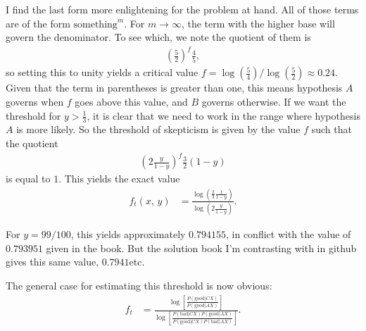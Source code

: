 \documentclass{article}
\begin{document}
I find the last form more enlightening for the problem at hand. All of those terms are of the form $\text{something}^m$. For $m\rightarrow\infty$, the term with the higher base will govern the denominator. To see which, we note the quotient of them is
\begin{align*}
	\left(\frac52\right)^f\frac45,
\end{align*}
so setting this to unity yields a critical value $f=\log\left(\frac54\right)/\log\left(\frac52\right)\approx0.24$. Given that the term in parentheses is greater than one, this means hypothesis $A$ governs when $f$ goes above this value, and $B$ governs otherwise. If we want the threshold for $y>\frac13$, it is clear that we need to work in the range where hypothesis $A$ is more likely. So the threshold of skepticism is given by the value $f$ such that the quotient
\begin{align*}
	\left(2\frac{y}{1-y}\right)^f\frac32(1-y)
\end{align*}
is equal to $1$. This yields the exact value
\begin{align*}
	f_t(x,\,y)&=\frac{\log\left(\frac23\frac1{1-y}\right)}{\log\left(2\frac{y}{1-y}\right)}.
\end{align*}

For $y=99/100$, this yields approximately $0.794155$, in conflict with the value of $0.793951$ given in the book. But the solution book I'm contrasting with in github gives this same value, $0.7941$etc.

The general case for estimating this threshold is now obvious:
\begin{align*}
	f_t&=\frac{\log\left[\frac{P(\text{good}|CX)}{P(\text{good}|AX)}\right]}{\log\left[\frac{P(\text{bad}|CX)P(\text{good}|AX)}{P(\text{good}|CX)P(\text{bad}|AX)}\right]}.
\end{align*}
\end{document}
